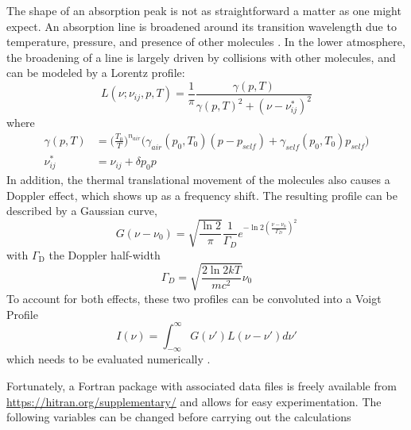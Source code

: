 \documentclass[10pt,a4paper,titlepage]{article}
\begin{document}
The shape of an absorption peak is not as straightforward a matter as
one might expect. An absorption line is broadened around its
transition wavelength due to temperature, pressure, and presence of
other molecules \citep{tennyson-al14:IUPAC}. In the lower atmosphere,
the broadening of a line is largely driven by collisions with other
molecules, and can be modeled by a Lorentz profile:
\begin{equation}
L(\nu; \nu_{ij}, p, T) = \frac{1}{\pi} \frac{\gamma(p, T)}{\gamma(p, T)^2 + (\nu - \nu^*_{ij})^2}
\end{equation}
where
\begin{equation}
\begin{split}
\gamma(p, T) & = \Bigg( \frac{T_0}{T} \Bigg)^{n_{air}} \bigg( \gamma_{air}(p_0, T_0)(p - p_{self}) + \gamma_{self}(p_0, T_0) p_{self} \bigg) \\
\nu_{ij}^* & = \nu_{ij} + \delta p_0 p
\end{split}
\end{equation}
In addition, the thermal translational movement of the molecules also
causes a Doppler effect, which shows up as a frequency shift. The
resulting profile can be described by a Gaussian curve, 
\begin{equation}
G(\nu - \nu_0) = \sqrt{\frac{\ln 2}{\pi}} \frac{1}{\Gamma_D} e^{-\ln 2 (\frac{\nu - \nu_0}{\Gamma_D})^2}
\end{equation}
with $\Gamma$$_{\text{D}}$ the Doppler half-width
\begin{equation}
\Gamma_D = \sqrt{\frac{2 \ln 2 k T}{m c^2}} \nu_0
\end{equation}
To account for both effects, these two profiles can be convoluted into
a Voigt Profile
\begin{equation}
I(\nu) = \int^{\infty}_{-\infty} G(\nu') L(\nu - \nu') d\nu'
\end{equation}
which needs to be evaluated numerically \citep{thompson93:voigt}.

Fortunately, a Fortran package with associated data files
\citep{gordon-al22:hitran2020,lamouroux-al15:linemixing} is freely
available from \url{https://hitran.org/supplementary/} and allows for easy
experimentation.  The following variables can be changed before
carrying out the calculations
\end{document}
